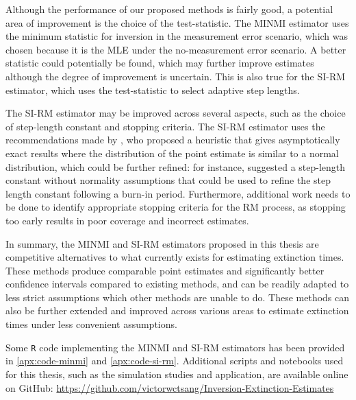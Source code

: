Although the performance of our proposed methods is fairly good, a potential area of improvement is the choice of the test-statistic. The MINMI estimator uses the minimum statistic for inversion in the measurement error scenario, which was chosen because it is the MLE under the no-measurement error scenario. A better statistic could potentially be found, which may further improve estimates although the degree of improvement is uncertain. This is also true for the SI-RM estimator, which uses the test-statistic to select adaptive step lengths.

The SI-RM estimator may be improved across several aspects, such as the choice of step-length constant and stopping criteria. The SI-RM estimator uses the recommendations made by \citet{Garthwaite1992}, who proposed a heuristic that gives asymptotically exact results where the distribution of the point estimate is similar to a normal distribution, which could be further refined: for instance, \citet{LlyodBotev2015} suggested a step-length constant without normality assumptions that could be used to refine the step length constant following a burn-in period. Furthermore, additional work needs to be done to identify appropriate stopping criteria for the RM process, as stopping too early results in poor coverage and incorrect estimates.

In summary, the MINMI and SI-RM estimators proposed in this thesis are competitive alternatives to what currently exists for estimating extinction times. These methods produce comparable point estimates and significantly better confidence intervals compared to existing methods, and can be readily adapted to less strict assumptions which other methods are unable to do. These methods can also be further extended and improved across various areas to estimate extinction times under less convenient assumptions.

Some \texttt{R} code implementing the MINMI and SI-RM estimators has been provided in \autoref{apx:code-minmi} and \autoref{apx:code-si-rm}. Additional scripts and notebooks used for this thesis, such as the simulation studies and application, are available online on GitHub: \url{https://github.com/victorwctsang/Inversion-Extinction-Estimates}